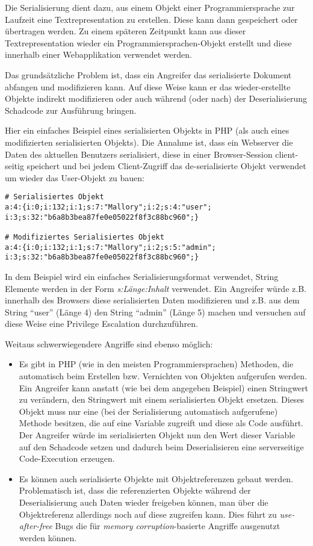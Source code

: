 Die Serialisierung dient dazu, aus einem Objekt einer Programmiersprache zur Laufzeit eine Textrepresentation zu erstellen. Diese kann dann gespeichert oder übertragen werden. Zu einem späteren Zeitpunkt kann aus dieser Textrepresentation wieder ein Programmiersprachen-Objekt erstellt und diese innerhalb einer Webapplikation verwendet werden.

Das grundsätzliche Problem ist, dass ein Angreifer das serialisierte Dokument abfangen und modifizieren kann. Auf diese Weise kann er das wieder-erstellte Objekte indirekt modifizieren oder auch während (oder nach) der Deserialisierung Schadcode zur Ausführung bringen.

Hier ein einfaches Beispiel eines serialisierten Objekts in PHP (als auch eines modifizierten serialisierten Objekts). Die Annahme ist, dass ein Webserver die Daten des aktuellen Benutzers serialisiert, diese in einer Browser-Session client-seitig speichert und bei jedem Client-Zugriff das de-serialisierte Objekt verwendet um wieder das User-Objekt zu bauen:

\begin{verbatim}
# Serialisiertes Objekt
a:4:{i:0;i:132;i:1;s:7:"Mallory";i:2;s:4:"user"; i:3;s:32:"b6a8b3bea87fe0e05022f8f3c88bc960";}

# Modifiziertes Serialisiertes Objekt
a:4:{i:0;i:132;i:1;s:7:"Mallory";i:2;s:5:"admin"; i:3;s:32:"b6a8b3bea87fe0e05022f8f3c88bc960";}
\end{verbatim}

In dem Beispiel wird ein einfaches Serialisierungsformat verwendet, String Elemente werden in der Form \textit{s:Länge:Inhalt} verwendet. Ein Angreifer würde z.B. innerhalb des Browsers diese serialisierten Daten modifizieren und z.B. aus dem String ``user'' (Länge 4) den String ``admin'' (Länge 5) machen und versuchen auf diese Weise eine Privilege Escalation durchzuführen.

Weitaus schwerwiegendere Angriffe sind ebenso möglich:

\begin{itemize}
	\item Es gibt in PHP (wie in den meisten Programmiersprachen) Methoden, die automatisch beim Erstellen bzw. Vernichten von Objekten aufgerufen werden. Ein Angreifer kann anstatt (wie bei dem angegeben Beispiel) einen Stringwert zu verändern, den Stringwert mit einem serialisierten Objekt ersetzen. Dieses Objekt muss nur eine (bei der Serialisierung automatisch aufgerufene) Methode besitzen, die auf eine Variable zugreift und diese als Code ausführt. Der Angreifer würde im serialisierten Objekt nun den Wert dieser Variable auf den Schadcode setzen und dadurch beim Deserialisieren eine serverseitige Code-Execution erzeugen.
	\item Es können auch serialisierte Objekte mit Objektreferenzen gebaut werden. Problematisch ist, dass die referenzierten Objekte während der Deserialisierung auch Daten wieder freigeben können, man über die Objektreferenz allerdings noch auf diese zugreifen kann. Dies führt zu \textit{use-after-free} Bugs die für \textit{memory corruption}-basierte Angriffe ausgenutzt werden können.
\end{itemize}

